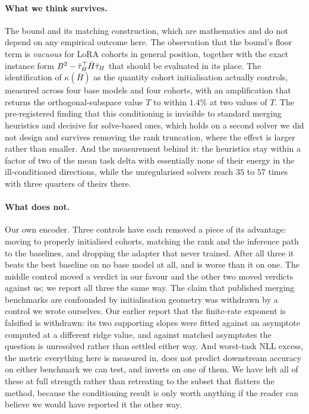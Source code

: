 \paragraph{What we think survives.} The bound and its matching construction,
which are mathematics and do not depend on any empirical outcome here. The
observation that the bound's floor term is \emph{vacuous} for LoRA cohorts in
general position, together with the exact instance form
$B^2 - \bar{\tau}_H^\top\bar H\bar{\tau}_H$ that should be evaluated in its place. The
identification of $\kappa(\bar H)$ as the quantity cohort initialisation
actually controls, measured across four base models and four cohorts, with an
amplification that returns the orthogonal-subspace value $T$ to within
$1.4\%$ at two values of $T$. The pre-registered finding that this conditioning
is invisible to standard merging heuristics and decisive for solve-based ones,
which holds on a second solver we did not design and survives removing the rank
truncation, where the effect is larger rather than smaller. And the measurement
behind it: the heuristics stay within a factor of two of the mean task delta
with essentially none of their energy in the ill-conditioned directions, while
the unregularised solvers reach $35$ to $57$ times with three quarters of
theirs there.

\paragraph{What does not.} Our own encoder. Three controls have each removed
a piece of its advantage: moving to properly initialised cohorts, matching the
rank and the inference path to the baselines, and dropping the adapter that
never trained. After all three it beats the best baseline on no base model at
all, and is worse than it on one. The middle control moved a verdict in our
favour and the other two moved verdicts against us; we report all three the
same way. The claim that published merging benchmarks are
confounded by initialisation geometry was withdrawn by a control we wrote
ourselves. Our earlier report that the finite-rate exponent is falsified is
withdrawn: its two supporting slopes were fitted against an asymptote computed
at a different ridge value, and against matched asymptotes the question is
unresolved rather than settled either way. And worst-task NLL excess, the
metric everything here is measured in, does not predict downstream accuracy on
either benchmark we can test, and inverts on one of them. We have left all of these at full strength rather than retreating
to the subset that flatters the method, because the conditioning result is
only worth anything if the reader can believe we would have reported it the
other way.

